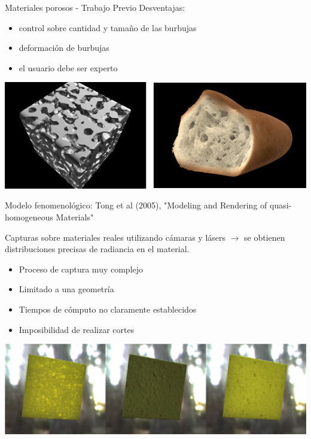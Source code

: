 \documentclass[spanish]{beamer}
\begin{document}
\begin{frame}{Materiales porosos - Trabajo Previo}
Desventajas: 
\begin{block}{}
\begin{itemize}
\item control sobre cantidad y tamaño de las burbujas
\item deformación de burbujas
\item el usuario debe ser experto
\end{itemize}
\end{block}

\includegraphics[scale = 0.3]{../figures/ratatouille}

\end{frame}

\begin{frame}

Modelo fenomenológico: Tong et al (2005), "Modeling and Rendering of quasi-homogeneous Materials"

Capturas sobre materiales reales utilizando cámaras y lásers $\rightarrow$ se obtienen distribuciones precisas de radiancia en el material.

\begin{itemize}
\item Proceso de captura muy complejo
\item Limitado a una geometría
\item Tiempos de cómputo no claramente establecidos
\item Imposibilidad de realizar cortes
\end{itemize}

\includegraphics[scale = 0.3]{../figures/esponja}

\end{frame}
\end{document}
